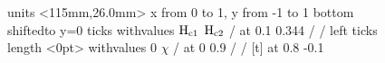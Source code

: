 \headheight 8pt



\pagestyle{empty}

\begin{figure}
\beginpicture
\setcoordinatesystem units <115mm,26.0mm>
\setplotarea x from 0 to 1, y from -1 to 1
\axis bottom shiftedto y=0 
ticks withvalues $\rm H_{c1}$ $\rm H_{c2}$ /  at 0.1 0.344 / /
\axis left ticks
length <0pt> withvalues 0 $\chi$ / at 0 0.9 / /
 [t] at 0.8 -0.1
\endpicture
\end{figure}

